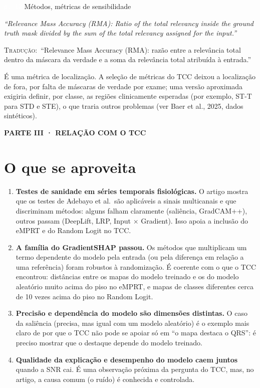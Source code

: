 \documentclass[11pt,a4paper]{article}
\newcommand{\pagechip}[1]{{\setlength{\fboxsep}{1.5pt}\colorbox{cAcc}{\textcolor{white}{\scriptsize\texttt{#1}}}}}
\newcommand{\partbar}[1]{\par\vspace{1.2em}\noindent\colorbox{black!80}{\parbox{\dimexpr\linewidth-2\fboxsep}{\color{white}\bfseries\sffamily\MakeUppercase{#1}}}\par\vspace{0.4em}}
\newenvironment{origquote}{\par\itshape\small}{\par}
\newenvironment{tradquote}{\par\small\textsc{Tradução:}\ }{\par}
\newcommand{\explab}[1]{\par\smallskip{\small\color{cAcc}\textbf{\MakeUppercase{#1}}}\par}
\begin{document}
\begin{citacard}{\pagechip{p. 17} Métodos, métricas de sensibilidade}
\begin{origquote}“Relevance Mass Accuracy (RMA): Ratio of the total relevancy inside the ground truth mask divided by the sum of the total relevancy assigned for the input.”\end{origquote}
\begin{tradquote}“Relevance Mass Accuracy (RMA): razão entre a relevância total dentro da máscara da verdade e a soma da relevância total atribuída à entrada.”\end{tradquote}
\explab{Explicação}
É uma métrica de localização. A seleção de métricas do TCC deixou a localização de fora, por falta de máscaras de verdade por exame; uma versão aproximada exigiria definir, por classe, as regiões clinicamente esperadas (por exemplo, ST-T para STD e STE), o que traria outros problemas (ver Baer et al., 2025, dados sintéticos).
\end{citacard}

\partbar{Parte III · Relação com o TCC}

\section{O que se aproveita}
\begin{enumerate}
\item \textbf{Testes de sanidade em séries temporais fisiológicas.} O artigo mostra que os testes de Adebayo et al.\ são aplicáveis a sinais multicanais e que discriminam métodos: alguns falham claramente (saliência, GradCAM++), outros passam (DeepLift, LRP, Input $\times$ Gradient). Isso apoia a inclusão do eMPRT e do Random Logit no TCC.
\item \textbf{A família do GradientSHAP passou.} Os métodos que multiplicam um termo dependente do modelo pela entrada (ou pela diferença em relação a uma referência) foram robustos à randomização. É coerente com o que o TCC encontrou: distâncias entre os mapas do modelo treinado e os do modelo aleatório muito acima do piso no eMPRT, e mapas de classes diferentes cerca de 10 vezes acima do piso no Random Logit.
\item \textbf{Precisão e dependência do modelo são dimensões distintas.} O caso da saliência (precisa, mas igual com um modelo aleatório) é o exemplo mais claro de por que o TCC não pode se apoiar só em “o mapa destaca o QRS”: é preciso mostrar que o destaque depende do modelo treinado.
\item \textbf{Qualidade da explicação e desempenho do modelo caem juntos} quando a SNR cai. É uma observação próxima da pergunta do TCC, mas, no artigo, a causa comum (o ruído) é conhecida e controlada.
\end{enumerate}
\end{document}
